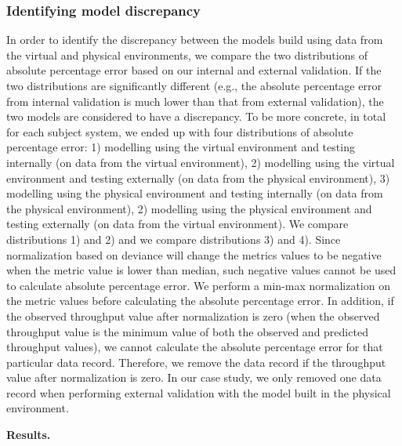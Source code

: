 \subsubsection{Identifying model discrepancy}
In order to identify the discrepancy between the models build using data from the virtual and physical environments, we compare the two distributions of absolute percentage error based on our internal and external validation. If the two distributions are significantly different (e.g., the absolute percentage error from internal validation is much lower than that from external validation), the two models are considered to have a discrepancy. To be more concrete, in total for each subject system, we ended up with four distributions of absolute percentage error: 1) modelling using the virtual environment and testing internally (on data from the virtual environment), 2) modelling using the virtual environment and testing externally (on data from the physical environment), 3) modelling using the physical environment and testing internally (on data from the physical environment), 2) modelling using the physical environment and testing externally (on data from the virtual environment). We compare distributions 1) and 2) and we compare distributions 3) and 4). Since normalization based on deviance will change the metrics values to be negative when the metric value is lower than median, such negative values cannot be used to calculate absolute percentage error. We perform a min-max normalization on the metric values before calculating the absolute percentage error. In addition, if the observed throughput value after normalization is zero (when the observed throughput value is the minimum value of both the observed and predicted throughput values), we cannot calculate the absolute percentage error for that particular data record. Therefore, we remove the data record if the throughput value after normalization is zero. In our case study, we only removed one data record when performing external validation with the model built in the physical environment. 


\noindent \textbf{Results.}

